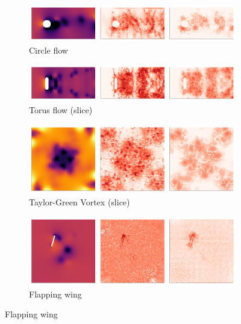 \documentclass[review]{elsarticle}
\begin{document}
\begin{figure}
    \centering
    \begin{subfigure}[a]{\textwidth}
        \centering 
        \includegraphics[width=\textwidth]{figures/circletriple.png}
        \caption[-1mm]{Circle flow}
    \end{subfigure}
    \begin{subfigure}[b]{\textwidth}
        \centering
        \includegraphics[width=\textwidth]{figures/donuttriple.png}
        \caption{Torus flow (slice)}
    \end{subfigure}
    \begin{subfigure}[c]{0.6\textwidth}
        \centering
        \includegraphics[width=\textwidth]{figures/TGVtriple.png}
        \caption{Taylor-Green Vortex (slice)}
    \end{subfigure}
    \begin{subfigure}[c]{0.6\textwidth}
        \centering
        \includegraphics[width=\textwidth]{figures/wingtriple.png}
        \caption{Flapping wing}
    \end{subfigure}

\end{figure}
\end{document}
